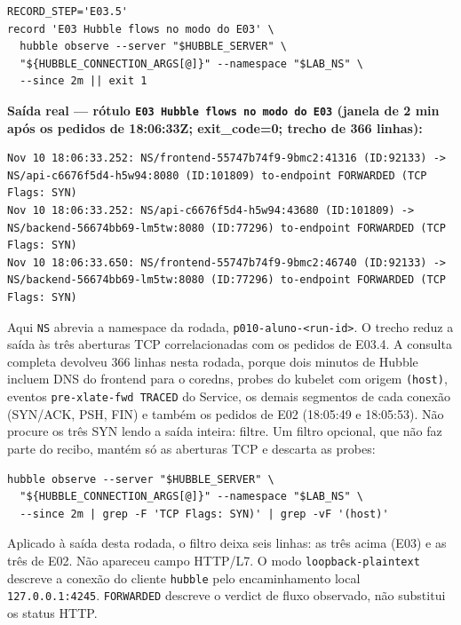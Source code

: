 \documentclass[12pt,openany,oneside,a4paper,chapter=TITLE,english,brazil]{abntex2}
\begin{document}
\begin{verbatim}
RECORD_STEP='E03.5'
record 'E03 Hubble flows no modo do E03' \
  hubble observe --server "$HUBBLE_SERVER" \
  "${HUBBLE_CONNECTION_ARGS[@]}" --namespace "$LAB_NS" \
  --since 2m || exit 1
\end{verbatim}

\clearpage

\textbf{Saída real --- rótulo \texttt{E03 Hubble flows no modo do E03} (janela de 2 min após os pedidos de 18:06:33Z; exit\_code=0; trecho de 366 linhas):}

\begin{verbatim}
Nov 10 18:06:33.252: NS/frontend-55747b74f9-9bmc2:41316 (ID:92133) -> NS/api-c6676f5d4-h5w94:8080 (ID:101809) to-endpoint FORWARDED (TCP Flags: SYN)
Nov 10 18:06:33.252: NS/api-c6676f5d4-h5w94:43680 (ID:101809) -> NS/backend-56674bb69-lm5tw:8080 (ID:77296) to-endpoint FORWARDED (TCP Flags: SYN)
Nov 10 18:06:33.650: NS/frontend-55747b74f9-9bmc2:46740 (ID:92133) -> NS/backend-56674bb69-lm5tw:8080 (ID:77296) to-endpoint FORWARDED (TCP Flags: SYN)
\end{verbatim}

Aqui \texttt{NS} abrevia a namespace da rodada, \texttt{p010-{}\allowbreak{}aluno-{}\allowbreak{}\textless{}run-{}\allowbreak{}id\textgreater{}}. O trecho reduz a saída às três aberturas TCP correlacionadas com os pedidos de E03.4. A consulta completa devolveu 366 linhas nesta rodada, porque dois minutos de Hubble incluem DNS do frontend para o coredns, probes do kubelet com origem \texttt{(\allowbreak{}host)}, eventos \texttt{pre-{}\allowbreak{}xlate-{}\allowbreak{}fwd TRACED} do Service, os demais segmentos de cada conexão (SYN/ACK, PSH, FIN) e também os pedidos de E02 (18:05:49 e 18:05:53). Não procure os três SYN lendo a saída inteira: filtre. Um filtro opcional, que não faz parte do recibo, mantém só as aberturas TCP e descarta as probes:

\begin{verbatim}
hubble observe --server "$HUBBLE_SERVER" \
  "${HUBBLE_CONNECTION_ARGS[@]}" --namespace "$LAB_NS" \
  --since 2m | grep -F 'TCP Flags: SYN)' | grep -vF '(host)'
\end{verbatim}

Aplicado à saída desta rodada, o filtro deixa seis linhas: as três acima (E03) e as três de E02. Não apareceu campo HTTP/L7. O modo \texttt{loopback-{}\allowbreak{}plaintext} descreve a conexão do cliente \texttt{hubble} pelo encaminhamento local \texttt{127.\allowbreak{}0.\allowbreak{}0.\allowbreak{}1:\allowbreak{}4245}. \texttt{FORWARDED} descreve o verdict de fluxo observado, não substitui os status HTTP.
\end{document}
